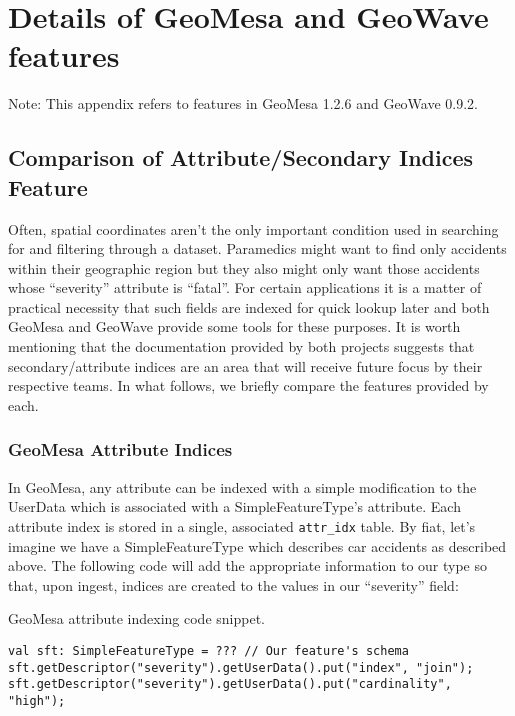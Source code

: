 \section{Details of GeoMesa and GeoWave features}
\label{appendix:features}

Note: This appendix refers to features in GeoMesa 1.2.6 and GeoWave 0.9.2.




\subsection{Comparison of Attribute/Secondary Indices Feature}
\label{appendix:features:indices}

Often, spatial coordinates aren't the only important condition used in searching for and filtering through a dataset.
Paramedics might want to find only accidents within their geographic region but they also might only want those accidents whose ``severity'' attribute is ``fatal''.
For certain applications it is a matter of practical necessity that such fields are indexed for quick lookup later and both GeoMesa and GeoWave provide some tools for these purposes.
It is worth mentioning that the documentation provided by both projects suggests that secondary/attribute indices are an area that will receive future focus by their respective teams.
In what follows, we briefly compare the features provided by each.


\subsubsection{GeoMesa Attribute Indices}

In GeoMesa, any attribute can be indexed with a simple modification to the UserData which is associated with a SimpleFeatureType's attribute.
Each attribute index is stored in a single, associated \texttt{attr\_idx} table.
By fiat, let's imagine we have a SimpleFeatureType which describes car accidents as described above.
The following code will add the appropriate information to our type so that, upon ingest, indices are created to the values in our ``severity'' field:

\begin{algorithm}[htb]
\caption{GeoMesa attribute indexing code snippet.}
\footnotesize{\begin{lstlisting}
val sft: SimpleFeatureType = ??? // Our feature's schema
sft.getDescriptor("severity").getUserData().put("index", "join");
sft.getDescriptor("severity").getUserData().put("cardinality", "high");
\end{lstlisting}}
\end{algorithm}

